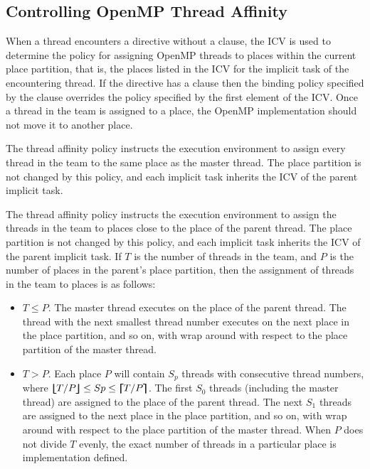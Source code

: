 \subsection{Controlling OpenMP Thread Affinity}
\label{subsec:Controlling OpenMP Thread Affinity}

When a thread encounters a  directive without a  clause, the  ICV is used to determine the policy for assigning OpenMP threads to places within the current place partition, that is, the places listed in the  ICV for the implicit task of the encountering thread. If the  directive has a  clause then the binding policy specified by the  clause overrides the policy specified by the first element of the  ICV. Once a thread in the team is assigned to a place, the OpenMP implementation should not move it to another place.

The  thread affinity policy instructs the execution environment to assign every thread in the team to the same place as the master thread. The place partition is not changed by this policy, and each implicit task inherits the  ICV of the parent implicit task.

The  thread affinity policy instructs the execution environment to assign the threads in the team to places close to the place of the parent thread. The place partition is not changed by this policy, and each implicit task inherits the  ICV of the parent implicit task. If $T$ is the number of threads in the team, and $P$ is the number of places in the parent's place partition, then the assignment of threads in the team to places is as follows:

\begin{itemize}
\item $T\leq P$.
The master thread executes on the place of the parent thread. The thread with the next smallest thread number executes on the next place in the place partition, and so on, with wrap around with respect to the place partition of the master thread.
\item $T>P$.
Each place $P$ will contain $S_{p}$ threads with consecutive thread numbers,
where $\blfloor T/P \brfloor \leq Sp \leq \blceil T/P \brceil$. The first $S_{0}$ threads (including the master thread) are assigned to the place of the parent thread. The next $S_{1}$ threads are assigned to the next place in the place partition, and so on, with wrap around with respect to the place partition of the master thread. When $P$ does not divide $T$ evenly, the exact number of threads in a particular place is implementation defined.
\end{itemize}


